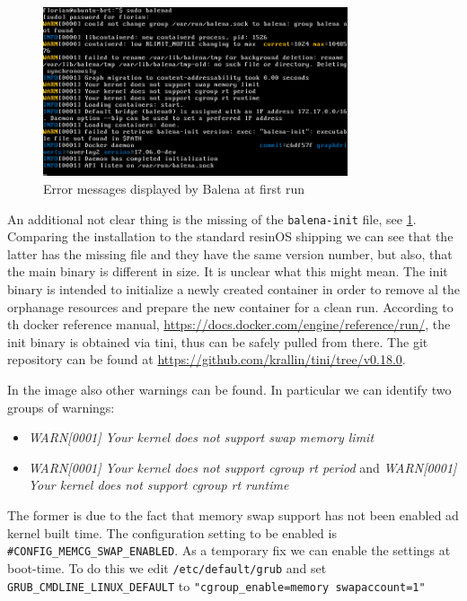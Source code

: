 \documentclass[]{scrartcl}
\begin{document}
\begin{figure}[t]
	\centering
	\includegraphics[width=0.8\textwidth]{balena-err}
	\caption{Error messages displayed by Balena at first run}
	\label{fig:balenad}
\end{figure}

An additional not clear thing is the missing of the \texttt{balena-init} file, see \ref{fig:balenad}. Comparing the installation to the standard resinOS shipping we can see that the latter has the missing file and they have the same version number, but also, that the main binary is different in size. It is unclear what this might mean. The init binary is intended to initialize a newly created container in order to remove al the orphanage resources and prepare the new container for a clean run. According to th docker reference manual, \url{https://docs.docker.com/engine/reference/run/}, the init binary is obtained via tini, thus can be safely pulled from there. The git repository can be found at \url{https://github.com/krallin/tini/tree/v0.18.0}.

In the image also other warnings can be found. In particular we can identify two groups of warnings:

\begin{itemize}
	\item \textit{WARN[0001] Your kernel does not support swap memory limit}

	\item \textit{WARN[0001] Your kernel does not support cgroup rt period} and \textit{WARN[0001] Your kernel does not support cgroup rt runtime} 
\end{itemize}

The former is due to the fact that memory swap support has not been enabled ad kernel built time. 
The configuration setting to be enabled is \texttt{\#CONFIG\_MEMCG\_SWAP\_ENABLED}. As a temporary fix we can enable the settings at boot-time. 
To do this we edit \texttt{/etc/default/grub} and set 
\texttt{GRUB\_CMDLINE\_LINUX\_DEFAULT} to \texttt{"cgroup\_enable=memory swapaccount=1"}
\end{document}
